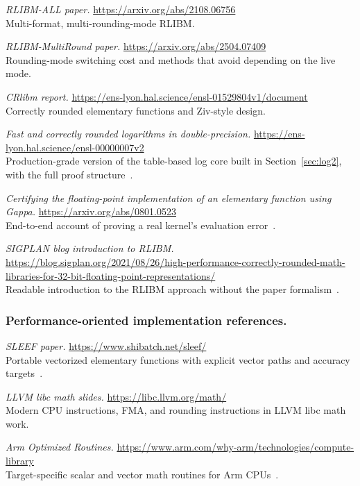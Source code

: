 \documentclass[manuscript, nonacm]{acmart}
\begin{document}
  \emph{RLIBM-ALL paper.}
  \url{https://arxiv.org/abs/2108.06756}\\
  Multi-format, multi-rounding-mode RLIBM.

  \emph{RLIBM-MultiRound paper.}
  \url{https://arxiv.org/abs/2504.07409}\\
  Rounding-mode switching cost and methods that avoid depending on the live
  mode.

  \emph{CRlibm report.}
  \url{https://ens-lyon.hal.science/ensl-01529804v1/document}\\
  Correctly rounded elementary functions and Ziv-style design.

  \emph{Fast and correctly rounded logarithms in double-precision.}
  \url{https://ens-lyon.hal.science/ensl-00000007v2}\\
  Production-grade version of the table-based log core built in
  Section~\ref{sec:log2}, with the full proof structure~\cite{dinechinlog}.

  \emph{Certifying the floating-point implementation of an elementary
  function using Gappa.}
  \url{https://arxiv.org/abs/0801.0523}\\
  End-to-end account of proving a real kernel's evaluation
  error~\cite{gappacert}.

  \emph{SIGPLAN blog introduction to RLIBM.}
  \url{https://blog.sigplan.org/2021/08/26/high-performance-correctly-rounded-math-libraries-for-32-bit-floating-point-representations/}\\
  Readable introduction to the RLIBM approach without the paper
  formalism~\cite{rlibmblog}.

  \subsubsection{Performance-oriented implementation references.}

  \emph{SLEEF paper.}
  \url{https://www.shibatch.net/sleef/}\\
  Portable vectorized elementary functions with explicit vector paths and
  accuracy targets~\cite{sleef}.

  \emph{LLVM libc math slides.}
  \url{https://libc.llvm.org/math/}\\
  Modern CPU instructions, FMA, and rounding instructions in LLVM libc math
  work.

  \emph{Arm Optimized Routines.}
  \url{https://www.arm.com/why-arm/technologies/compute-library}\\
  Target-specific scalar and vector math routines for Arm CPUs~\cite{arm}.
\end{document}
